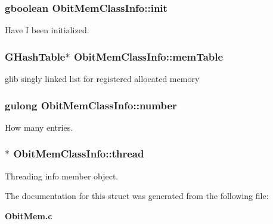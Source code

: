 \subsubsection{\setlength{\rightskip}{0pt plus 5cm}gboolean {\bf Obit\-Mem\-Class\-Info::init}}\label{structObitMemClassInfo_o0}


Have I been initialized. 

\subsubsection{\setlength{\rightskip}{0pt plus 5cm}GHash\-Table$\ast$ {\bf Obit\-Mem\-Class\-Info::mem\-Table}}\label{structObitMemClassInfo_o2}


glib singly linked list for registered allocated memory 

\subsubsection{\setlength{\rightskip}{0pt plus 5cm}gulong {\bf Obit\-Mem\-Class\-Info::number}}\label{structObitMemClassInfo_o3}


How many entries. 

\subsubsection{$\ast$ {\bf Obit\-Mem\-Class\-Info::thread}}\label{structObitMemClassInfo_o1}


Threading info member object. 



The documentation for this struct was generated from the following file:\begin{CompactItemize}
\item 
{\bf Obit\-Mem.c}\end{CompactItemize}

